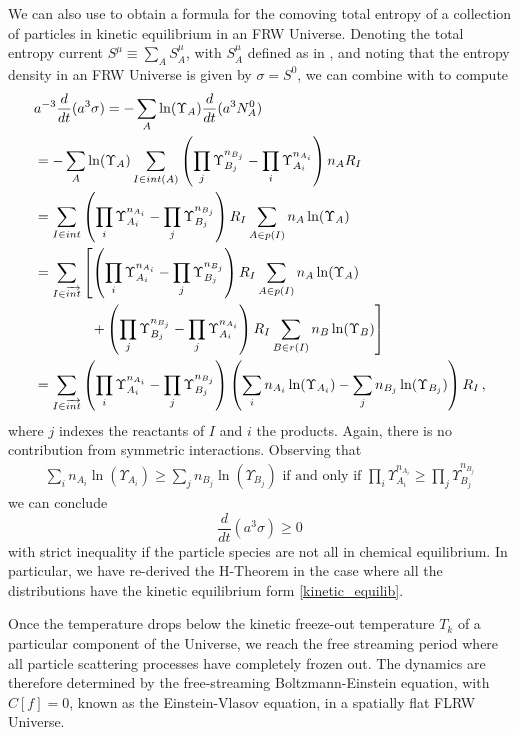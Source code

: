 {We can also use  to obtain a formula for the  comoving total entropy of a collection of particles in kinetic equilibrium in an FRW Universe. Denoting the total entropy current  $S^\mu\equiv\sum_A S_A^\mu$, with $S_A^\mu$ defined as in , and noting that the entropy density in an FRW Universe  is given by $\sigma=S^0$, we can   combine  with  to compute
\begin{align}
&a^{-3}\frac{d}{dt}(a^3\sigma)=-\sum_A \ln(\Upsilon_A) \frac{d}{dt}(a^3N_A^0)\\
&=-\sum_A \ln(\Upsilon_A)\sum_{I\in int(A)} \left(\prod_j\Upsilon_{B_j}^{n_{B_j}}- \prod_i\Upsilon_{A_i}^{n_{A_i}}\right)n_A R_I\notag\\
&=\sum_{I\in int} \left( \prod_i\Upsilon_{A_i}^{n_{A_i}}-\prod_j\Upsilon_{B_j}^{n_{B_j}}\right)R_I\sum_{A\in p(I)}n_A \ln(\Upsilon_A)\notag\\
&=\sum_{I\in \overrightarrow{int}} \left[\left( \prod_i\Upsilon_{A_i}^{n_{A_i}}-\prod_j\Upsilon_{B_j}^{n_{B_j}}\right)R_I\sum_{A\in p(I)}n_A \ln(\Upsilon_A)\right.\notag\\
&\left.\qquad\qquad+\left( \prod_j\Upsilon_{B_j}^{n_{B_j}}-\prod_j\Upsilon_{A_i}^{n_{A_i}}\right)R_I\sum_{B\in r(I)}n_B \ln(\Upsilon_B)\right]\notag\\
&=\sum_{I\in \overrightarrow{int}} \left( \prod_i\Upsilon_{A_i}^{n_{A_i}}-\prod_j\Upsilon_{B_j}^{n_{B_j}}\right)\left(\sum_i n_{A_i}\ln(\Upsilon_{A_i})-\sum_jn_{B_j}\ln(\Upsilon_{B_j})\right)R_I\,,\notag
\end{align}
where $j$ indexes the reactants of $I$ and $i$ the products.  Again, there is no contribution from symmetric interactions.  Observing that 
 \begin{align}
     \sum_in_{A_i}\ln(\Upsilon_{A_i})\geq \sum_jn_{B_j} \ln(\Upsilon_{B_j}) \text{ if and only if }\prod_i \Upsilon^{n_{A_i}}_{A_i}\geq\prod_j\Upsilon^{n_{B_j}}_{B_j}
 \end{align} 
 we can conclude 
\begin{equation}
\frac{d}{dt}(a^3\sigma)\geq 0
\end{equation}
with strict inequality if the particle species are not all in chemical equilibrium.  In particular, we have re-derived the H-Theorem in the case where all the distributions have the kinetic equilibrium form \eqref{kinetic_equilib}.
}

Once the temperature drops below the kinetic freeze-out temperature $T_k$ of a particular component of the Universe, we reach the free streaming period where all particle scattering processes have completely frozen out. The dynamics are therefore determined by the free-streaming Boltzmann-Einstein equation,  with $C[f]=0$, known as the Einstein-Vlasov equation, in a spatially flat FLRW Universe.

